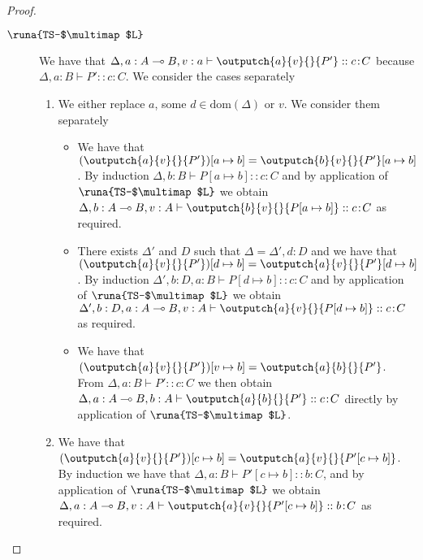 \begin{lemma}
\begin{proof}
\begin{description}
\item[$\runa{TS-$\multimap$L}$] We have that $\Delta,a:A\multimap B,v:a \vdash \outputch{a}{v}{}{P'} :: c\!:\!C$ because $\Delta,a:B\vdash P' :: c\!:\!C$. We consider the cases separately
\begin{enumerate}
    \item We either replace $a$, some $d\in\text{dom}(\Delta)$ or $v$. We consider them separately
    \begin{itemize}
        \item We have that $(\outputch{a}{v}{}{P'})[a\mapsto b]=\outputch{b}{v}{}{P'}[a\mapsto b]$. By induction $\Delta,b:B\vdash P[a\mapsto b] :: c\!:\!C$ and by application of $\runa{TS-$\multimap$L}$ we obtain $\Delta,b:A\multimap B,v:A\vdash \outputch{b}{v}{}{P[a\mapsto b]} :: c\!:\!C$ as required.
        
        \item There exists $\Delta'$ and $D$ such that $\Delta=\Delta',d:D$ and we have that $(\outputch{a}{v}{}{P'})[d\mapsto b]=\outputch{a}{v}{}{P'}[d\mapsto b]$. By induction $\Delta',b:D,a:B\vdash P[d\mapsto b] :: c\!:\!C$ and by application of $\runa{TS-$\multimap$L}$ we obtain $\Delta',b:D,a:A\multimap B,v:A\vdash \outputch{a}{v}{}{P[d\mapsto b]} :: c\!:\!C$ as required. 
        
        \item We have that $(\outputch{a}{v}{}{P'})[v\mapsto b]=\outputch{a}{b}{}{P'}$. From $\Delta,a:B\vdash P' :: c\!:\!C$ we then obtain $\Delta,a:A\multimap B,b:A\vdash \outputch{a}{b}{}{P'} :: c\!:\!C$ directly by application of $\runa{TS-$\multimap$L}$.
    \end{itemize}
    
    \item We have that $(\outputch{a}{v}{}{P'})[c\mapsto b]=\outputch{a}{v}{}{P'[c\mapsto b]}$. By induction we have that $\Delta,a:B\vdash P'[c\mapsto b] :: b\!:\!C$, and by application of $\runa{TS-$\multimap$L}$ we obtain $\Delta,a:A\multimap B,v:A \vdash \outputch{a}{v}{}{P'[c\mapsto b]} :: b\!:\!C$ as required.
\end{enumerate}


\end{description}
\end{proof}
\end{lemma}

